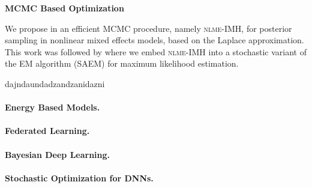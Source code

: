 \documentclass[twoside,11pt]{article}
\begin{document}
\lipsum[35]

\vspace{0.15in}
\textbf{MCMC Based Optimization} 
\vspace{0.08in}

We propose in \citep{karimi2018eff} an efficient MCMC procedure, namely \textsc{nlme-IMH}, for posterior sampling in nonlinear mixed effects models, based on the Laplace approximation.
This work was followed by \citep{karimi2018fsaem} where we embed \textsc{nlme-IMH} into a stochastic variant of the EM algorithm (SAEM) for maximum likelihood estimation.

\citep{karimi2020misso} 
\citep{karimi2020anila}







\vspace{0.2in}
\textbf{} 
\vspace{0.2in}

dajndaundadzandzanidazni

\vspace{0.08in}
\paragraph{Energy Based Models.} \lipsum[35]

\vspace{0.08in}
\paragraph{Federated Learning.} \lipsum[35]

\vspace{0.08in}
\paragraph{Bayesian Deep Learning.} \lipsum[35]

\vspace{0.08in}
\paragraph{Stochastic Optimization for DNNs.} \lipsum[35]


\newpage



\textbf{}
\vspace{-0.3in}
\nocite{*}



\end{document}

